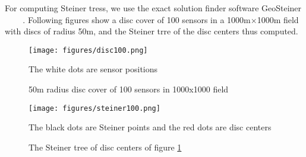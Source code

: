 For computing Steiner tress, we use the exact solution finder software GeoSteiner ~\cite{geosteiner1} ~\cite{geosteiner2} ~\cite{geosteiner3}. Following figures show a disc cover of 100 sensors in a 1000m$\times$1000m field with discs of radius 50m, and the Steiner trre of the disc centers thus computed.

\begin{figure}[H]
\centering
\texttt{[image: figures/disc100.png]}
\caption{50m radius disc cover of 100 sensors in 1000x1000 field} \label{fig:disc100}
\medskip
\small
The white dots are sensor positions
\end{figure}

\begin{figure}[H]
\centering
\texttt{[image: figures/steiner100.png]}
\caption{The Steiner tree of disc centers of figure \ref{fig:disc100}}
\medskip
\small
The black dots are Steiner points and the red dots are disc centers
\end{figure}
